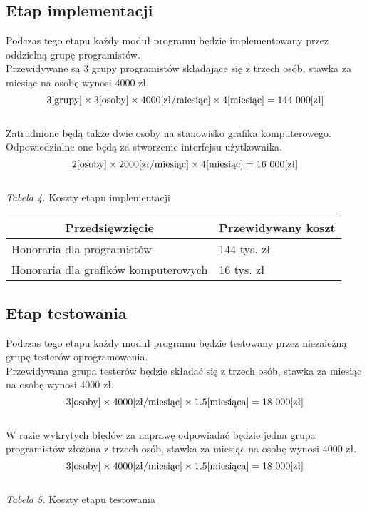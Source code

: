 \documentclass [11pt, a4paper, leqno]	{article}	%
\begin{document}
\subsection{Etap implementacji}
\noindent
Podczas tego etapu każdy moduł programu będzie implementowany przez oddzielną grupę programistów. \\
Przewidywane są 3 grupy programistów składające się z trzech osób, stawka za miesiąc na osobę wynosi 4000 zł. \\
\begin{equation}3 \text{[grupy]} \times 3 \text{[osoby]} \times 4000 \text{[zł/miesiąc]} \times  4 \text{[miesiąc]} = 144\\\ 000 \text{[zł]} \end{equation} \\
Zatrudnione będą także dwie osoby na stanowisko grafika komputerowego. Odpowiedzialne one będą za stworzenie interfejsu użytkownika. \\
\begin{equation}2 \text{[osoby]} \times 2000 \text{[zł/miesiąc]} \times 4 \text{[miesiąc]} = 16\\\ 000 \text{[zł]} \end{equation} \\
\newpage
\textit{Tabela 4.} Koszty etapu implementacji

\begin{center}
	\begin{tabular}{| l | l |}
		\hline
		\multicolumn{1}{|c|}{Przedsięwzięcie} & 
		\multicolumn{1}{|c|}{Przewidywany koszt} \\ \hline \hline
		Honoraria dla programistów & 144 tys. zł \\ \hline
		Honoraria dla grafików komputerowych & 16 tys. zł \\ \hline
	\end{tabular}
\end{center}

\subsection{Etap testowania}
\noindent
Podczas tego etapu każdy moduł programu będzie testowany przez niezależną grupę testerów oprogramowania. \\
Przewidywana grupa testerów będzie składać się z trzech osób, stawka za miesiąc na osobę wynosi 4000 zł. \\
\begin{equation}3 \text{[osoby]} \times 4000 \text{[zł/miesiąc]} \times 1.5 \text{[miesiąca]} = 18\\\ 000 \text{[zł]} \end{equation} \\
W razie wykrytych błędów za naprawę odpowiadać będzie jedna grupa programistów złożona z trzech osób, stawka za miesiąc na osobę wynosi 4000 zł. \\
\begin{equation}3 \text{[osoby]} \times 4000 \text{[zł/miesiąc]} \times 1.5 \text{[miesiąca]} = 18\\\ 000 \text{[zł]} \end{equation} \\
\textit{Tabela 5.} Koszty etapu testowania
\end{document}
